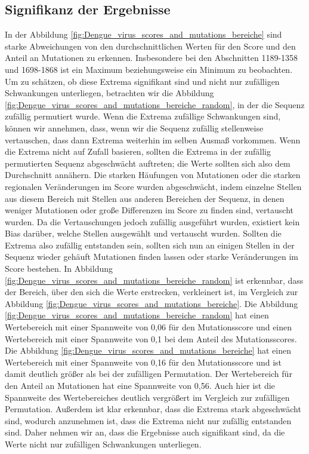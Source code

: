 \documentclass[german,version-2022-01]{uzl-thesis}
\begin{document}
\subsection{Signifikanz der Ergebnisse}
In der Abbildung \ref{fig:Dengue_virus_scores_and_mutations_bereiche} sind starke Abweichungen von den durchschnittlichen Werten f\"ur den Score und den Anteil an Mutationen zu erkennen. Insbesondere bei den Abschnitten 1189-1358 und 1698-1868 ist ein Maximum beziehungsweise ein Minimum zu beobachten. Um zu sch\"atzen, ob diese Extrema signifikant sind und nicht nur zuf\"alligen Schwankungen unterliegen, betrachten wir die Abbildung \ref{fig:Dengue_virus_scores_and_mutations_bereiche_random}, in der die Sequenz zuf\"allig permutiert wurde. Wenn die Extrema zuf\"allige Schwankungen sind, k\"onnen wir annehmen, dass, wenn wir die Sequenz zuf\"allig stellenweise vertauschen, dass dann Extrema weiterhin im selben Ausma\ss{} vorkommen. Wenn die Extrema nicht auf Zufall basieren, sollten die Extrema in der zuf\"allig permutierten Sequenz abgeschw\"acht auftreten; die Werte sollten sich also dem Durchschnitt ann\"ahern. Die starken H\"aufungen von Mutationen oder die starken regionalen Ver\"anderungen im Score wurden abgeschw\"acht, indem einzelne Stellen aus diesem Bereich mit Stellen aus anderen Bereichen der Sequenz, in denen weniger Mutationen oder gro\ss{}e Differenzen im Score zu finden sind, vertauscht wurden. Da die Vertauschungen jedoch zuf\"allig ausgef\"uhrt wurden, existiert kein Bias dar\"uber, welche Stellen ausgew\"ahlt und vertauscht wurden. Sollten die Extrema also zuf\"allig entstanden sein, sollten sich nun an einigen Stellen in der Sequenz wieder geh\"auft Mutationen finden lassen oder starke Ver\"anderungen im Score bestehen. 
In Abbildung \ref{fig:Dengue_virus_scores_and_mutations_bereiche_random} ist erkennbar, dass der Bereich, \"uber den sich die Werte erstrecken, verkleinert ist, im Vergleich zur Abbildung \ref{fig:Dengue_virus_scores_and_mutations_bereiche}. Die Abbildung \ref{fig:Dengue_virus_scores_and_mutations_bereiche_random} hat einen Wertebereich mit einer Spannweite von 0,06 f\"ur den Mutationsscore und einen Wertebereich mit einer Spannweite von 0,1 bei dem Anteil des Mutationsscores. Die Abbildung \ref{fig:Dengue_virus_scores_and_mutations_bereiche} hat einen Wertebereich mit einer Spannweite von 0,16 f\"ur den Mutationsscore und ist damit deutlich gr\"o\ss{}er als bei der zuf\"alligen Permutation. Der Wertebereich f\"ur den Anteil an Mutationen hat eine Spannweite von 0,56. Auch hier ist die Spannweite des Wertebereiches deutlich vergr\"o\ss{}ert im Vergleich zur zuf\"alligen Permutation. Au\ss{}erdem ist klar erkennbar, dass die Extrema stark abgeschw\"acht sind, wodurch anzunehmen ist, dass die Extrema nicht nur zuf\"allig entstanden sind. Daher nehmen wir an, dass die Ergebnisse auch signifikant sind, da die Werte nicht nur zuf\"alligen Schwankungen unterliegen.  
\end{document}
